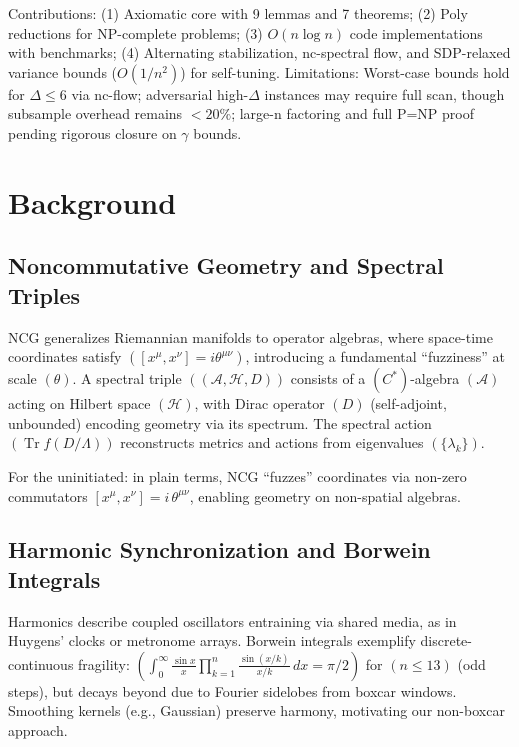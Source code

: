 \documentclass{article}
\begin{document}
Contributions: (1) Axiomatic core with 9 lemmas and 7 theorems; (2) Poly reductions for NP-complete problems; (3) $O(n \log n)$ code implementations with benchmarks; (4) Alternating stabilization, nc-spectral flow, and SDP-relaxed variance bounds ($O(1/n^2)$) for self-tuning. Limitations: Worst-case bounds hold for $\Delta \leq 6$ via nc-flow; adversarial high-$\Delta$ instances may require full scan, though subsample overhead remains $<20\%$; large-n factoring and full P=NP proof pending rigorous closure on $\gamma$ bounds.

\section{Background}

\subsection{Noncommutative Geometry and Spectral Triples}

NCG generalizes Riemannian manifolds to operator algebras, where space-time coordinates satisfy $([x^\mu, x^\nu] = i \theta^{\mu\nu})$, introducing a fundamental ``fuzziness'' at scale $(\theta)$. A spectral triple $((\mathcal{A}, \mathcal{H}, D))$ consists of a $(C^*)$-algebra $(\mathcal{A})$ acting on Hilbert space $(\mathcal{H})$, with Dirac operator $(D)$ (self-adjoint, unbounded) encoding geometry via its spectrum. The spectral action $(\operatorname{Tr} f(D/\Lambda))$ reconstructs metrics and actions from eigenvalues $(\{\lambda_k\})$.

For the uninitiated: in plain terms, NCG ``fuzzes'' coordinates via non-zero commutators $[x^\mu, x^\nu] = i\,\theta^{\mu\nu}$, enabling geometry on non-spatial algebras.

\subsection{Harmonic Synchronization and Borwein Integrals}

Harmonics describe coupled oscillators entraining via shared media, as in Huygens' clocks or metronome arrays. Borwein integrals exemplify discrete-continuous fragility: $(\int_0^\infty \frac{\sin x}{x} \prod_{k=1}^n \frac{\sin(x/k)}{x/k} \, dx = \pi/2)$ for $(n \leq 13)$ (odd steps), but decays beyond due to Fourier sidelobes from boxcar windows. Smoothing kernels (e.g., Gaussian) preserve harmony, motivating our non-boxcar approach.
\end{document}
